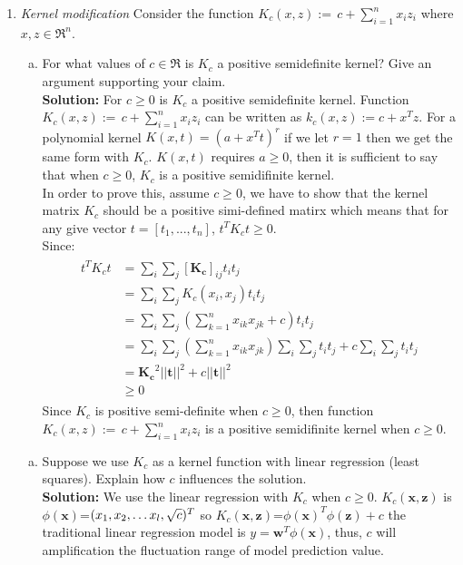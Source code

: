 \documentclass[A4,12pt]{article}
\begin{document}
\begin{enumerate}[6.]
\begin{enumerate}[(b)]
       \end{enumerate}
       \begin{enumerate}[7.]
\item
\textit{Kernel modification} Consider the function $K_c(x,z):=\, c+\sum_{i=1}^{n} x_i z_i$ where $x,z\in \Re^n$.
    \begin{enumerate}[(a)]
    \item For what values of $c\in \Re$ is $K_c$ a positive semidefinite kernel? Give an argument supporting your claim.\\
    \textbf{Solution:} For $c \ge 0$ is $K_c$ a positive semidefinite kernel. Function $K_c(x,z):=\, c+\sum_{i=1}^{n} x_i z_i$ can be written as $k_c(x,z) := c+x^Tz$. For a polynomial kernel $K(x,t) = (a+x^Tt)^r$ if we let $r = 1$ then we get the same form with $K_c$. $K(x,t)$ requires $a \ge 0$, then it is sufficient to say that when $c \ge 0$, $K_c$ is a positive semidifinite kernel. \\
    In order to prove this, assume $c \ge 0$, we have to show that the kernel matrix $K_c$ should be a positive simi-defined matirx which means that for any give vector $t = [t_1,...,t_n]$, $t^{T}K_{c}t \ge 0$. \\Since:
    \begin{align}
      \begin{split}
      t^{T}K_{c}t &= \sum_{i}\sum_{j}[\mathbf{K_c}]_{ij}t_{i}t_{j}\\ 
      &= \sum_{i}\sum_{j}K_c(x_i,x_j)t_{i}t_{j}\\
      &= \sum_{i}\sum_{j}(\sum_{k=1}^{n}x_{ik}x_{jk}+c)t_{i}t_{j}\\
      &= \sum_{i}\sum_{j}(\sum_{k=1}^{n}x_{ik}x_{jk})\sum_{i}\sum_{j}t_{i}t_{j}+c\sum_{i}\sum_{j}t_{i}t_{j}\\
      &= \mathbf{K_{c}}^2||\mathbf{t}||^2+c|| \mathbf{t} ||^2\\
      &\ge 0
      \end{split}
    \end{align} 
    Since $K_c$ is positive semi-definite when $c \ge 0$, then function $K_c(x,z):=\, c+\sum_{i=1}^{n} x_i z_i$ is a positive semidifinite kernel when $c \ge 0$. 
    \end{enumerate}
    \begin{enumerate}[(b)]
    \item Suppose we use $K_c$ as a kernel function with linear regression (least squares). Explain how $c$ influences the solution.\\
    \textbf{Solution:} We use the linear regression with $K_c$ when $c \geqslant 0$. $K_c(\boldsymbol{x},\boldsymbol{z})$ is $\phi(\boldsymbol{x})$=$(x_1,\\x_2,\ldots x_l,\sqrt{c})^T$ so $K_c(\boldsymbol{x},\boldsymbol{z})$=$\phi(\boldsymbol{x})^T\phi(\boldsymbol{z})+c$ the traditional linear regression model is $y=\boldsymbol{w}^T\phi(\boldsymbol{x})$, thus, $c$ will amplification the fluctuation range of model prediction value.

\end{enumerate}
\end{enumerate}
\end{enumerate}
\end{document}
